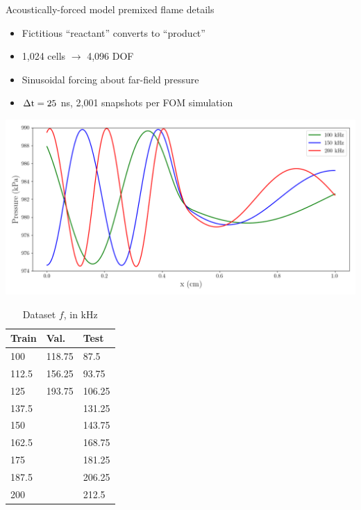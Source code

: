 \documentclass[]{beamer}
\begin{document}
\begin{frame}[noframenumbering]{Acoustically-forced model premixed flame details}
	\begin{itemize}
		\item Fictitious ``reactant'' converts to ``product''
		\item 1,024 cells $\rightarrow$ 4,096 DOF
		\item Sinusoidal forcing about far-field pressure
		\item $\Delta \text{t} = 25$ ns, 2,001 snapshots per FOM simulation
	\end{itemize}
	\begin{minipage}{0.58\linewidth}
		\includegraphics[width=0.99\linewidth]{Images/experiments/transientFlame/fom_press_snaps.png}
	\end{minipage}
	\begin{minipage}{0.39\linewidth}
		\scriptsize
		\begin{table}
			\centering
			\begin{tabular}{ lll }
				\toprule
				Train & Val. & Test  \\
				\midrule
				100   & 118.75 & 87.5 \\
				112.5 & 156.25 & 93.75 \\
				125   & 193.75 & 106.25 \\
				137.5 &        & 131.25 \\
				150   &        & 143.75 \\
				162.5 &        & 168.75 \\
				175   &        & 181.25 \\
				187.5 &        & 206.25 \\
				200   &        & 212.5 \\
				\bottomrule
			\end{tabular}
			\caption*{Dataset $f$, in kHz}
		\end{table}
		\normalsize
	\end{minipage}
\end{frame}
\end{document}
